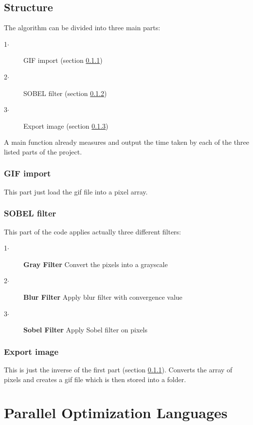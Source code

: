 \documentclass[conference,compsoc]{IEEEtran}
\begin{document}
\subsection{Structure}
The algorithm can be divided into three main parts:
\begin{description}
	\item[1$\cdot$] GIF import (section \ref{sec:GIF-import})
	\item[2$\cdot$] SOBEL filter (section \ref{sec:SOBEL-filter})
	\item[3$\cdot$] Export image (section \ref{sec:Export-image})
\end{description}
A main function already measures and output the time taken by each of the three listed parts of the project.

\subsubsection{GIF import}\label{sec:GIF-import}
This part just load the gif file into a pixel array. 

\subsubsection{SOBEL filter}\label{sec:SOBEL-filter}
This part of the code applies actually three different filters:
\begin{description}
	\item[1$\cdot$] \textbf{Gray Filter} Convert the pixels into a grayscale
	\item[2$\cdot$] \textbf{Blur Filter} Apply blur filter with convergence value
	\item[3$\cdot$] \textbf{Sobel Filter} Apply Sobel filter on pixels
\end{description}

\subsubsection{Export image}\label{sec:Export-image}
This is just the inverse of the first part (section \ref{sec:GIF-import}). Converts the array of pixels and creates a gif file which is then stored into a folder.

\section{Parallel Optimization Languages}
\end{document}
